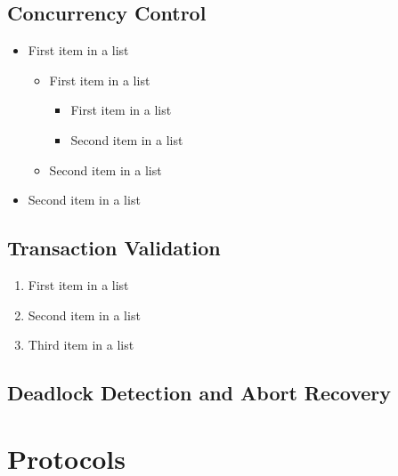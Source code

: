 \documentclass[paper=a4, fontsize=11pt]{scrartcl}
\numberwithin{equation}{section}        %
\numberwithin{figure}{section}          %
\numberwithin{table}{section}               %
\begin{document}
\subsection{Concurrency Control}
\begin{itemize}
    \item First item in a list 
        \begin{itemize}
        \item First item in a list 
            \begin{itemize}
            \item First item in a list 
            \item Second item in a list 
            \end{itemize}
        \item Second item in a list 
        \end{itemize}
    \item Second item in a list 
\end{itemize}

\subsection{Transaction Validation}
\begin{enumerate}
    \item First item in a list 
    \item Second item in a list 
    \item Third item in a list
\end{enumerate}

\subsection{Deadlock Detection and Abort Recovery}

\section{Protocols}
\end{document}
